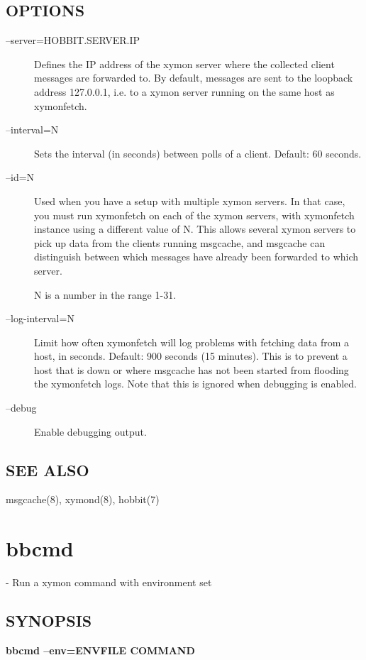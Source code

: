  
\subsection{OPTIONS}
\begin{description}
\item[--server=HOBBIT.SERVER.IP] Defines the IP address of the xymon
  server where the collected client messages are forwarded to. By
  default, messages are sent to the loopback address 127.0.0.1,
  i.e. to a xymon server running on the same host as xymonfetch. 


 

\item[--interval=N] Sets the interval (in seconds) between polls of a client. Default: 60 seconds. 

 

\item[--id=N] Used when you have a setup with multiple xymon
 servers. In that case, you must run xymonfetch on each of the xymon
 servers, with xymonfetch instance using a different value of N. This
 allows several xymon servers to pick up data from the clients
 running msgcache, and msgcache can distinguish between which messages
 have already been forwarded to which server.  

 N is a number in the range 1-31. 

 

\item[--log-interval=N] Limit how often xymonfetch will log problems
  with fetching data from a host, in seconds. Default: 900 seconds (15
  minutes). This is to prevent a host that is down or where msgcache
  has not been started from flooding the xymonfetch logs. Note that
  this is ignored when debugging is enabled. 


 

\item[--debug] Enable debugging output. 

 


\end{description}
\subsection{SEE ALSO}
msgcache(8), xymond(8), hobbit(7) 

 
%
\newpage
\section{bbcmd}
  - Run a xymon command with environment set \subsection{SYNOPSIS}
\textbf{bbcmd --env=ENVFILE COMMAND}



